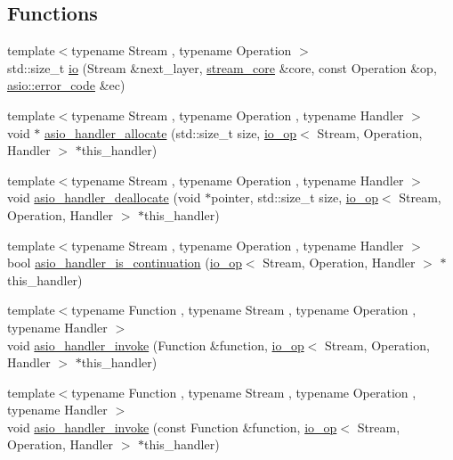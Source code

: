 \subsection*{Functions}
\begin{DoxyCompactItemize}
\item 
{\footnotesize template$<$typename Stream , typename Operation $>$ }\\std\+::size\+\_\+t \hyperlink{namespaceasio_1_1ssl_1_1detail_abd5ed3f43e67677cec6a431e47c9028d}{io} (Stream \&next\+\_\+layer, \hyperlink{structasio_1_1ssl_1_1detail_1_1stream__core}{stream\+\_\+core} \&core, const Operation \&op, \hyperlink{classasio_1_1error__code}{asio\+::error\+\_\+code} \&ec)
\item 
{\footnotesize template$<$typename Stream , typename Operation , typename Handler $>$ }\\void $\ast$ \hyperlink{namespaceasio_1_1ssl_1_1detail_a29b2b2eab1e6edb42933ee2969a18ebc}{asio\+\_\+handler\+\_\+allocate} (std\+::size\+\_\+t size, \hyperlink{classasio_1_1ssl_1_1detail_1_1io__op}{io\+\_\+op}$<$ Stream, Operation, Handler $>$ $\ast$this\+\_\+handler)
\item 
{\footnotesize template$<$typename Stream , typename Operation , typename Handler $>$ }\\void \hyperlink{namespaceasio_1_1ssl_1_1detail_a587c6917825e4baefe4926c1f32b543e}{asio\+\_\+handler\+\_\+deallocate} (void $\ast$pointer, std\+::size\+\_\+t size, \hyperlink{classasio_1_1ssl_1_1detail_1_1io__op}{io\+\_\+op}$<$ Stream, Operation, Handler $>$ $\ast$this\+\_\+handler)
\item 
{\footnotesize template$<$typename Stream , typename Operation , typename Handler $>$ }\\bool \hyperlink{namespaceasio_1_1ssl_1_1detail_a6695fdda4d5f7273ce93f699e1763435}{asio\+\_\+handler\+\_\+is\+\_\+continuation} (\hyperlink{classasio_1_1ssl_1_1detail_1_1io__op}{io\+\_\+op}$<$ Stream, Operation, Handler $>$ $\ast$this\+\_\+handler)
\item 
{\footnotesize template$<$typename Function , typename Stream , typename Operation , typename Handler $>$ }\\void \hyperlink{namespaceasio_1_1ssl_1_1detail_ae71bf174570136672e479b80488e5811}{asio\+\_\+handler\+\_\+invoke} (Function \&function, \hyperlink{classasio_1_1ssl_1_1detail_1_1io__op}{io\+\_\+op}$<$ Stream, Operation, Handler $>$ $\ast$this\+\_\+handler)
\item 
{\footnotesize template$<$typename Function , typename Stream , typename Operation , typename Handler $>$ }\\void \hyperlink{namespaceasio_1_1ssl_1_1detail_a1774bf62d1c3e0c3ac18683125dac6a9}{asio\+\_\+handler\+\_\+invoke} (const Function \&function, \hyperlink{classasio_1_1ssl_1_1detail_1_1io__op}{io\+\_\+op}$<$ Stream, Operation, Handler $>$ $\ast$this\+\_\+handler)

\end{DoxyCompactItemize}
